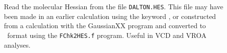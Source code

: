 \begin{description}

\item[] Read the molecular Hessian from the file
\verb|DALTON.HES|. This file may have been made in an earlier
calculation using the keyword , or constructed from a
calculation with the GaussianXX program and converted to \siraba\
format using the \verb|FChk2HES.f| program. Useful in VCD and VROA
analyses\index{VCD}\index{ROA}.


\end{description}
